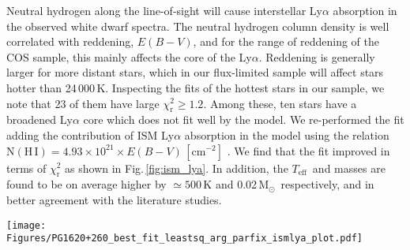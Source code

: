 \documentclass[fleqn,usenatbib, useAMS]{mnras}
\newcommand{\Teff}{\mbox{$T_{\mathrm{eff}}$}}
\newcommand{\logg}{\mbox{$\log g$}}
\newcommand{\Msun}{\mbox{$\mathrm{M_\odot}$}}
\begin{document}
Neutral hydrogen along the line-of-sight will cause interstellar Ly$\alpha$ absorption in the observed white dwarf spectra. The neutral hydrogen column density is well correlated with reddening, $E(B-V)$, \citep{1994ApJ...427..274D} and for the range of reddening of the COS sample, this mainly affects the core of the Ly$\alpha$. Reddening is generally larger for more distant stars, which in our flux-limited sample will affect stars hotter than 24\,000\,K. Inspecting the fits of the hottest stars in our sample, we note that 23 of them have large $\chi^{2}_\mathrm{r}\geq1.2$. Among these, ten stars have a broadened Ly$\alpha$ core which does not fit well by the model. We re-performed the fit adding the contribution of ISM Ly$\alpha$ absorption in the model using the relation $\mathrm{N(H\,I)}=4.93\times10^{21}\times E(B-V)\,\mathrm{[cm^{-2}]}$ \citep{1994ApJ...427..274D}. We find that the fit improved in terms of  $\chi^{2}_\mathrm{r}$ as shown in Fig.\,\ref{fig:ism_lya}. In addition, the \Teff\ and masses are found to be on average higher by $\simeq500$\,K and 0.02\,\Msun\ respectively, and in better agreement with the literature studies.

\begin{figure*}
\centering
\texttt{[image: Figures/PG1620+260\_best\_fit\_leastsq\_arg\_parfix\_ismlya\_plot.pdf]}
\caption{Left panel: The model fit to the COS spectrum of PG\,1620+260 (with $A_V=0.05$) illustrates the effect of including the contribution of interstellar Ly$\alpha$ absorption ($\rm{N (H\,I)}=7.95\times10^{19}\,\rm{cm}^{-2}$). Shown as red solid line is the fit including interstellar Ly$\alpha$, and as blue dashed line the fit without the interstellar component. The zoomed inset (indicated by the grey box) in the top right corner shows the model fit to the core of Ly$\alpha$. The best fit values, \Teff, \logg, mass, $\rm{\chi^{2}_{r}}$ from both the cases (red: with ISM Ly$\alpha$, blue: without ISM Ly$\alpha$) are labelled in the figure. Right panel: The corresponding 95\,per cent confidence ellipses (red and grey for two M-R relations) show that the \Teff\ and \logg\ are slightly higher when ISM Ly$\alpha$ is considered in the fit than when it is not (blue dashed ellipses). The literature values from \citet{Liebert2005} (LBH05), \citet{Gianninas2011} (G11), \citet{nicola2021} (GF21), and from Pan-STARRS data (PanST) derived in this work are shown in the figure.  Refer to Fig.\,\ref{fig:spec_fit_wd_good} for a more detailed description of symbols.}
\label{fig:ism_lya}
\end{figure*}
\end{document}
